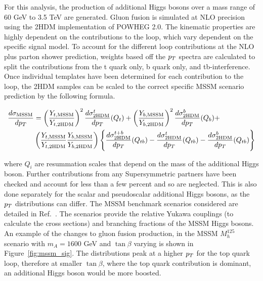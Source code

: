 For this analysis, the production of additional Higgs bosons over a mass range of 60 GeV to 3.5 TeV are generated.
Gluon fusion is simulated at NLO precision using the 2HDM implementation of POWHEG 2.0.
The kinematic properties are highly dependent on the contributions to the loop, which vary dependent on the specific signal model.
To account for the different loop contributions at the NLO plus parton shower prediction, weights based off the $p_{T}$ spectra are calculated to split the contributions from the t quark only, b quark only, and tb-interference.
Once individual templates have been determined for each contribution to the loop, the 2HDM samples can be scaled to the correct specific MSSM scenario prediction by the following formula.

\begin{align}
\frac{d\sigma_{\text{MSSM}}}{dp_{T}} & = \left(\frac{Y_{t,\text{MSSM}}}{Y_{t,\text{2HDM}}}\right)^{2}\frac{d\sigma^{t}_{\text{2HDM}}}{dp_{T}}(Q_{t}) + \left(\frac{Y_{b,\text{MSSM}}}{Y_{b,\text{2HDM}}}\right)^{2}\frac{d\sigma^{b}_{\text{2HDM}}}{dp_{T}}(Q_{b}) + \nonumber \\
& \left(\frac{Y_{t,\text{MSSM}}}{Y_{t,\text{2HDM}}}\frac{Y_{b,\text{MSSM}}}{Y_{b,\text{2HDM}}}\right) \left\{ \frac{d\sigma^{t+b}_{\text{2HDM}}}{dp_{T}}(Q_{tb}) - \frac{d\sigma^{t}_{\text{2HDM}}}{dp_{T}}(Q_{tb}) - \frac{d\sigma^{b}_{\text{2HDM}}}{dp_{T}}(Q_{tb}) \right\}
\label{eqn:mssm_xs}
\end{align}

where $Q_i$ are resummation scales that depend on the mass of the additional Higgs boson.
Further contributions from any Supersymmetric partners have been checked and account for less than a few percent and so are neglected.
This is also done separately for the scalar and pseudoscalar additional Higgs bosons, as the $p_{T}$ distributions can differ.
The MSSM benchmark scenarios considered are detailed in Ref.~\cite{}.
The scenarios provide the relative Yukawa couplings (to calculate the cross sections) and branching fractions of the MSSM Higgs bosons.
An example of the changes to gluon fusion production, in the MSSM $M_{h}^{125}$ scenario with $m_{A} = 1600$ GeV and $\tan\beta$ varying is shown in Figure~\ref{fig:mssm_sig}.
The distributions peak at a higher $p_{T}$ for the top quark loop, therefore at smaller $\tan\beta$, where the top quark contribution is dominant, an additional Higgs boson would be more boosted. \\

